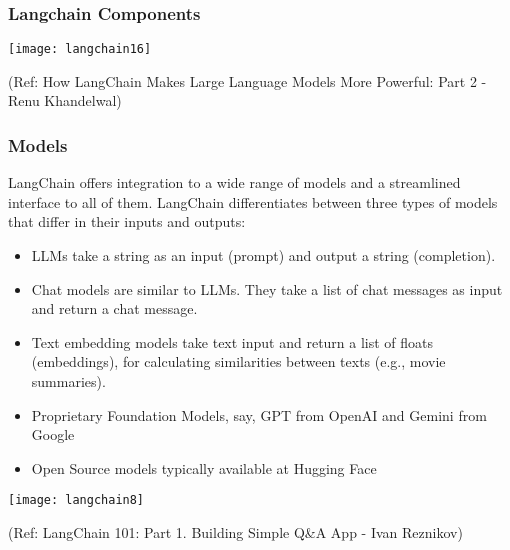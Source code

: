 \begin{frame}[fragile]\frametitle{Langchain Components}

\begin{center}
\texttt{[image: langchain16]}
\end{center}	  


{\tiny (Ref: How LangChain Makes Large Language Models More Powerful: Part 2 -Renu Khandelwal)}



\end{frame}

\begin{frame}[fragile]\frametitle{Models}

LangChain offers integration to a wide range of models and a streamlined interface to all of them. LangChain differentiates between three types of models that differ in their inputs and outputs:

\begin{itemize}
\item LLMs take a string as an input (prompt) and output a string (completion).
\item Chat models are similar to LLMs. They take a list of chat messages as input and return a chat message.
\item Text embedding models take text input and return a list of floats (embeddings), for calculating similarities between texts (e.g., movie summaries).
\item Proprietary Foundation Models, say, GPT from OpenAI and Gemini from Google 
\item Open Source models typically available at Hugging Face
\end{itemize}

\begin{center}
\texttt{[image: langchain8]}
\end{center}	  


{\tiny (Ref: LangChain 101: Part 1. Building Simple Q\&A App - Ivan Reznikov)}

\end{frame}

